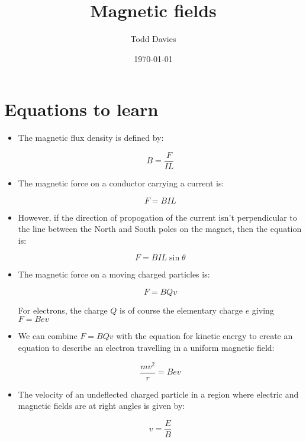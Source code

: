 \documentclass{article}
\title{Magnetic fields}
\author{Todd Davies}
\date{\today}
\begin{document}
\lhead{\today}

\maketitle

\section*{Equations to learn}
\thispagestyle{empty}

\begin{itemize}
	
	\item The magnetic flux density is defined by:
	
	\[
		B = \frac{F}{IL}
	\]

	\item The magnetic force on a conductor carrying a current is:
	
	\[
		F=BIL
	\]

	\item However, if the direction of propogation of the current isn't
	perpendicular to the line between the North and South poles on the magnet,
	then the equation is:

	\[
		F=BIL\sin{\theta}
	\]

	\item The magnetic force on a moving charged particles is:

	\[
		F=BQv
	\]

	For electrons, the charge $Q$ is of course the elementary charge $e$ giving $F=Bev$

    \item We can combine $F=BQv$ with the equation for kinetic energy to create
	an equation to describe an electron travelling in a uniform magnetic field:

	\[
		\frac{mv^2}{r} = Bev
	\]

	\item The velocity of an undeflected charged particle in a region where
	electric and magnetic fields are at right angles is given by:

	\[
		v = \frac{E}{B}
	\]

\end{itemize}

\end{document}
